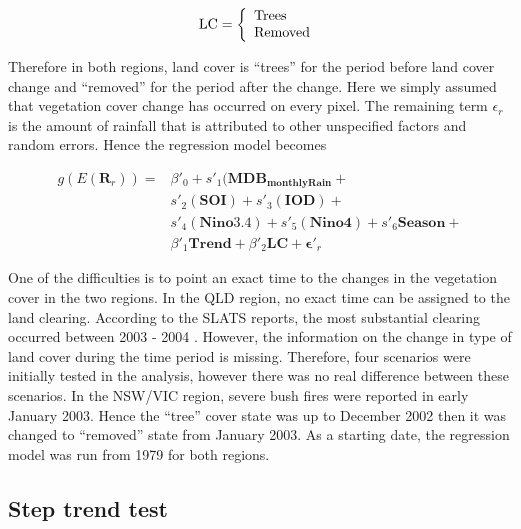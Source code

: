 \documentclass[fleqn,10pt,lineno]{wlpeerj} %
\begin{document}
\begin{equation}
  \mbox{LC} = \left\{
  \begin{array}{ll}
     \mbox{Trees} \\
     \mbox{Removed}
  \end{array} \right.\\
\label{eq:dummyC}
\end{equation}

Therefore in both regions, land cover is ``trees'' for the period before
land cover change and ``removed'' for the period after the change. Here
we simply assumed that vegetation cover change has occurred on every
pixel. The remaining term \(\epsilon_r\) is the amount of rainfall that
is attributed to other unspecified factors and random errors. Hence the
regression model becomes \vspace{0.5cm}

\begin{equation}
\begin{array}{lll}
g(E(\mathbf{R}_r)) = &\beta'_0 + s'_1(\mathbf{MDB_{monthlyRain}} + \\
  &s'_2(\mathbf{SOI}) + s'_3(\mathbf{IOD}) + \\
  &s'_4(\mathbf{Nino3.4}) + s'_5(\mathbf{Nino4}) + s'_6\mathbf{Season} + \\
  &\beta'_1\mathbf{Trend} + \beta'_2\mathbf{LC} + \boldsymbol{\epsilon'}_r
\end{array}
\label{eq:model2}
\end{equation}

One of the difficulties is to point an exact time to the changes in the
vegetation cover in the two regions. In the QLD region, no exact time
can be assigned to the land clearing. According to the SLATS reports,
the most substantial clearing occurred between 2003 - 2004 . However,
the information on the change in type of land cover during the time
period is missing. Therefore, four scenarios were initially tested in
the analysis, however there was no real difference between these
scenarios. In the NSW/VIC region, severe bush fires were reported in
early January 2003. Hence the ``tree'' cover state was up to December
2002 then it was changed to ``removed'' state from January 2003. As a
starting date, the regression model was run from 1979 for both regions.

\subsection{Step trend test}\label{step-trend-test}
\end{document}
